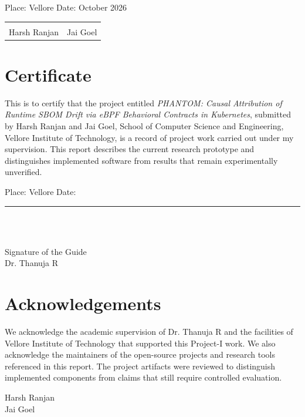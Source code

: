 \documentclass[12pt,a4paper,oneside]{report}
\begin{document}
Place: Vellore \hfill Date: October 2026\\[0.6in]
\begin{tabularx}{\textwidth}{>{\centering\arraybackslash}X >{\centering\arraybackslash}X}\hrulefill&\hrulefill\\[-2pt]Harsh Ranjan&Jai Goel\end{tabularx}
\chapter*{Certificate}
This is to certify that the project entitled \emph{PHANTOM: Causal Attribution of Runtime SBOM Drift via eBPF Behavioral Contracts in Kubernetes}, submitted by Harsh Ranjan and Jai Goel, School of Computer Science and Engineering, Vellore Institute of Technology, is a record of project work carried out under my supervision. This report describes the current research prototype and distinguishes implemented software from results that remain experimentally unverified.

Place: Vellore \hfill Date: \rule{1.2in}{0.4pt}\\[0.6in]
\begin{flushright}\hrulefill\\Signature of the Guide\\Dr. Thanuja R\end{flushright}
\chapter*{Acknowledgements}
We acknowledge the academic supervision of Dr. Thanuja R and the facilities of Vellore Institute of Technology that supported this Project-I work. We also acknowledge the maintainers of the open-source projects and research tools referenced in this report. The project artifacts were reviewed to distinguish implemented components from claims that still require controlled evaluation.
\begin{flushright}Harsh Ranjan\\Jai Goel\end{flushright}
\tableofcontents\listoffigures\listoftables
\end{document}
